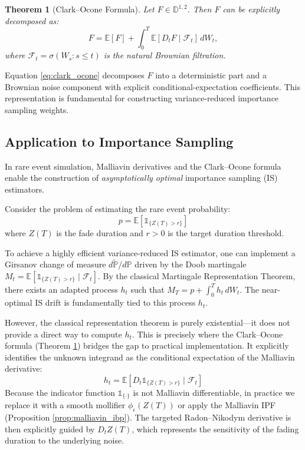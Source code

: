 \documentclass[11pt]{article}
\newtheorem{theorem}{Theorem}
\begin{document}
\begin{theorem}[Clark--Ocone Formula]
\label{thm:clark_ocone}
Let $F \in \mathbb{D}^{1,2}$. Then $F$ can be explicitly decomposed as:
\begin{equation}
F = \mathbb{E}[F] + \int_0^T \mathbb{E}[D_t F \mid \mathcal{F}_t] \, dW_t,
\label{eq:clark_ocone}
\end{equation}
where $\mathcal{F}_t = \sigma(W_s : s \leq t)$ is the natural Brownian filtration.
\end{theorem}

\noindent
Equation \eqref{eq:clark_ocone} decomposes $F$ into a deterministic part and a Brownian noise component with explicit conditional-expectation coefficients. This representation is fundamental for constructing variance-reduced importance sampling weights.

\subsection{Application to Importance Sampling}

In rare event simulation, Malliavin derivatives and the Clark--Ocone formula enable the construction of \emph{asymptotically optimal} importance sampling (IS) estimators. 

Consider the problem of estimating the rare event probability:
$$
p = \mathbb{E}[\mathds{1}_{\{Z(T) > r\}}]
$$
where $Z(T)$ is the fade duration and $r > 0$ is the target duration threshold.

To achieve a highly efficient variance-reduced IS estimator, one can implement a Girsanov change of measure $d\widetilde{\mathbb{P}} / d\mathbb{P}$ driven by the Doob martingale $M_t = \mathbb{E}[ \mathds{1}_{\{Z(T) > r\}} \mid \mathcal{F}_t ]$. By the classical Martingale Representation Theorem, there exists an adapted process $h_t$ such that $M_T = p + \int_0^T h_t \, dW_t$. The near-optimal IS drift is fundamentally tied to this process $h_t$.

However, the classical representation theorem is purely existential—it does not provide a direct way to compute $h_t$. This is precisely where the Clark--Ocone formula (Theorem \ref{thm:clark_ocone}) bridges the gap to practical implementation. It explicitly identifies the unknown integrand as the conditional expectation of the Malliavin derivative:
$$
h_t = \mathbb{E}[ D_t \mathds{1}_{\{Z(T) > r\}} \mid \mathcal{F}_t ]
$$
Because the indicator function $\mathds{1}_{\{\cdot\}}$ is not Malliavin differentiable, in practice we replace it with a smooth mollifier $\phi_\epsilon(Z(T))$ or apply the Malliavin IPF (Proposition \ref{prop:malliavin_ibp}). The targeted Radon--Nikodym derivative is then explicitly guided by $D_t Z(T)$, which represents the sensitivity of the fading duration to the underlying noise.
\end{document}
